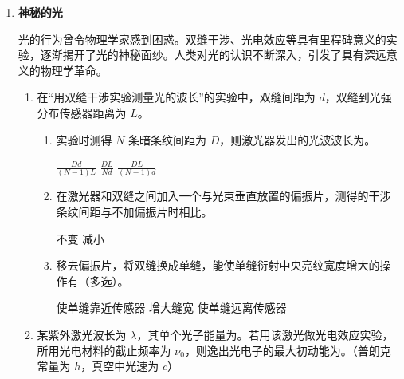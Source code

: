 \documentclass[\gkver]{gaokaozhenti}
\begin{document}
\begin{enumerate}
\item
\textbf{神秘的光}

光的行为曾令物理学家感到困惑。双缝干涉、光电效应等具有里程碑意义的实验，逐渐揭开了光的神秘面纱。人类对光的认识不断深入，引发了具有深远意义的物理学革命。
\begin{enumerate}
	\item
	在“用双缝干涉实验测量光的波长”的实验中，双缝间距为 $d$，双缝到光强分布传感器距离为 $L$。
	\begin{enumerate}
		\item
		实验时测得 $N$ 条暗条纹间距为 $D$，则激光器发出的光波波长为。

		{$\frac{Dd}{(N-1)L}$}
		{$\frac{DL}{Nd}$}
		{$\frac{DL}{(N-1)d}$}

		\item
		在激光器和双缝之间加入一个与光束垂直放置的偏振片，测得的干涉条纹间距与不加偏振片时相比。

		{不变}
		{减小}

		\item
		移去偏振片，将双缝换成单缝，能使单缝衍射中央亮纹宽度增大的操作有（多选）。

		{使单缝靠近传感器}
		{增大缝宽}
		{使单缝远离传感器}
	\end{enumerate}

	\item
	某紫外激光波长为 $\lambda$，其单个光子能量为。若用该激光做光电效应实验，所用光电材料的截止频率为 $\nu_{0}$，则逸出光电子的最大初动能为。（普朗克常量为 $h$，真空中光速为 $c$）
\end{enumerate}
\end{enumerate}
\end{document}

